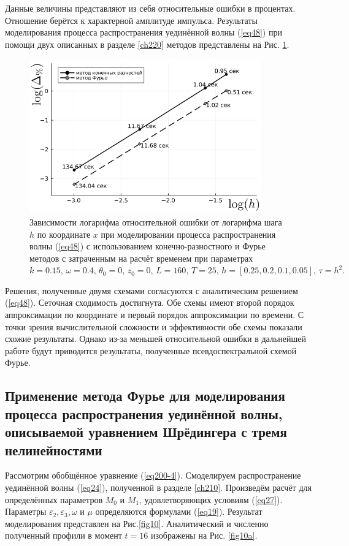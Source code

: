 \documentclass[14pt,a4paper]{extreport}
\begin{document}
			Данные величины представляют из себя относительные ошибки в процентах. Отношение берётся к характерной амплитуде импульса.
			Результаты моделирования процесса распространения уединённой волны (\ref{eq48}) при помощи двух описанных в разделе \ref{ch220} методов представлены на Рис. \ref{fig300-1}.
			\begin{figure}[H]
				\center
				\includegraphics[width=10cm,trim={0 0 0 0},clip]{pic2.png}
				\caption{Зависимости логарифма относительной ошибки от логарифма шага \(h\) по координате \(x\) при моделировании процесса распространения волны (\ref{eq48}) с использованием конечно-разностного и Фурье методов с затраченным на расчёт временем при параметрах
				\(k=0.15,\,\omega=0.4,\,\theta_{0}=0,\,z_{0}=0,\,L=160,\, T=25, \, h=[0.25, 0.2, 0.1, 0.05],\, \tau=h^{2}.\)}
				\label{fig300-1}
			\end{figure}

			Решения, полученные двумя схемами согласуются с аналитическим решением (\ref{eq48}). Сеточная сходимость достигнута. Обе схемы имеют второй порядок аппроксимации по координате и первый порядок аппроксимации по времени. С точки зрения вычислительной сложности и эффективности обе схемы показали схожие результаты. Однако из-за меньшей относительной ошибки в дальнейшей работе будут приводится результаты, полученные псевдоспектральной схемой Фурье.
		\subsection{Применение метода Фурье для моделирования процесса распространения уединённой волны, описываемой уравнением Шрёдингера с тремя нелинейностями}\label{ch320}
			Рассмотрим обобщённое уравнение (\ref{eq200-4}). Смоделируем распространение уединённой волны (\ref{eq24}), полученной в разделе \ref{ch210}. Произведём расчёт для определённых параметров \(M_{0}\) и \(M_{1}\), удовлетворяющих условиям (\ref{eq27}). Параметры \(\varepsilon_{2}\),\,\(\varepsilon_{3}\),\,\(\omega\) и \(\mu\) определяются формулами (\ref{eq19}). Результат моделирования представлен на Рис.\ref{fig10}. Аналитический и численно полученный профили в момент \(t=16\) изображены на Рис. \ref{fig10a}.
\end{document}
